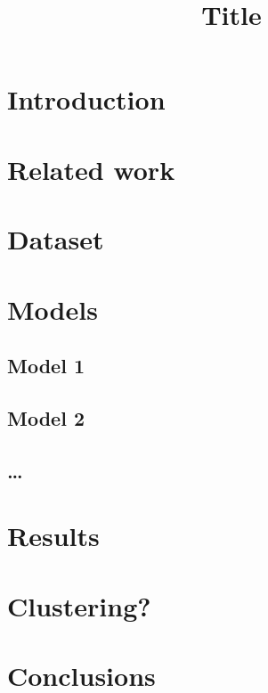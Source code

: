 \documentclass[10pt, a4paper]{article}
\title{Title}
\begin{document}
\maketitleabstract

\section{Introduction}

\section{Related work}

\section{Dataset}

\section{Models}

\subsection{Model 1}

\subsection{Model 2}

\subsection{\ldots}

\section{Results}

\section{Clustering?}

\section{Conclusions}



 
\end{document}
